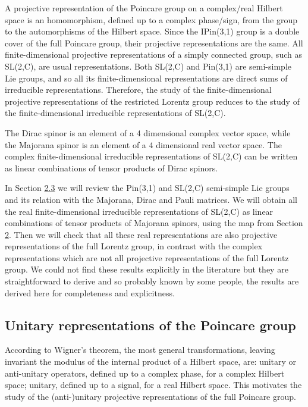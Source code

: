 \documentclass[11pt]{book}
\begin{document}
A projective representation of the Poincare group on a complex/real
Hilbert space is an homomorphism, defined up to a complex phase/sign,
from the group to the automorphisms of the Hilbert space. Since the
IPin(3,1) group is a double cover of the full Poincare group, their
projective representations are the
same\cite{Berg2001Pin}. All
finite-dimensional projective representations of a simply connected
group, such as SL(2,C), are usual
representations\cite{Weinberg1995quantum}. Both SL(2,C) and Pin(3,1) are semi-simple Lie groups, and so all
its finite-dimensional representations are direct sums of irreducible
representations\cite{Hall2003Lie}.
Therefore, the study of the finite-dimensional projective
representations of the restricted Lorentz group reduces to the study of
the finite-dimensional irreducible representations of SL(2,C).

The Dirac spinor is an element of a 4 dimensional complex vector space,
while the Majorana spinor is an element of a 4 dimensional real vector
space\cite{Todorov2011Clifford}\cite{Aste2010direct}\cite{Pal2011Dirac}\cite{Dreiner2010Two}.
The complex finite-dimensional irreducible representations of SL(2,C)
can be written as linear combinations of tensor products of Dirac
spinors.

In Section \protect\hyperlink{section:Finite}{2.3} we will review the
Pin(3,1) and SL(2,C) semi-simple Lie groups and its relation with the
Majorana, Dirac and Pauli matrices. We will obtain all the real
finite-dimensional irreducible representations of SL(2,C) as linear
combinations of tensor products of Majorana spinors, using the map from
Section \protect\hyperlink{section:Systems}{2}. Then we will check that
all these real representations are also projective representations of
the full Lorentz group, in contrast with the complex representations
which are not all projective representations of the full Lorentz group.
We could not find these results explicitly in the literature but they
are straightforward to derive and so probably known by some people, the
results are derived here for completeness and explicitness.

\hypertarget{unitary-representations-of-the-poincare-group}{%
\subsection{Unitary representations of the Poincare
group}\label{unitary-representations-of-the-poincare-group}}

According to Wigner's theorem, the most general transformations, leaving
invariant the modulus of the internal product of a Hilbert space, are:
unitary or anti-unitary operators, defined up to a complex phase, for a
complex Hilbert space; unitary, defined up to a signal, for a real
Hilbert space\cite{Molnuxe1r1998algebraic}\cite{Varadarajan2007Geometry}. This motivates the study of the (anti-)unitary projective
representations of the full Poincare group.
\end{document}
